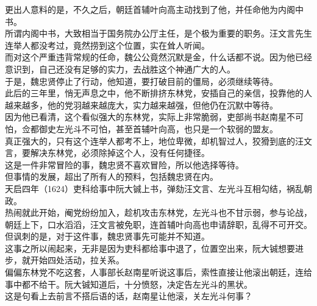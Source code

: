 \begin{multicols}{\theparacolNo}
更出人意料的是，不久之后，朝廷首辅叶向高主动找到了他，并任命他为内阁中书。\\

所谓内阁中书，大致相当于国务院办公厅主任，是个极为重要的职务。汪文言先生连举人都没考过，竟然捞到这个位置，实在耸人听闻。\\

而对这个严重违背常规的任命，魏公公竟然沉默是金，什么话都不说。因为他已经意识到，自己还没有足够的实力，去战胜这个神通广大的人。\\

于是，魏忠贤停止了行动，他知道，要打破目前的僵局，必须继续等待。\\

此后的三年里，悄无声息之中，他不断排挤东林党，安插自己的亲信，投靠他的人越来越多，他的党羽越来越庞大，实力越来越强，但他仍在沉默中等待。\\

因为他已看清，这个看似强大的东林党，实际上非常脆弱，吏部尚书赵南星不可怕，佥都御史左光斗不可怕，甚至首辅叶向高，也只是一个软弱的盟友。\\

真正强大的，只有这个连举人都考不上，地位卑微，却机智过人，狡猾到底的汪文言，要解决东林党，必须除掉这个人，没有任何捷径。\\

这是一件非常冒险的事，魏忠贤不喜欢冒险，所以他选择等待。\\

但事情的发展，超出了所有人的预料，包括魏忠贤在内。\\

天启四年（1624）吏科给事中阮大铖上书，弹劾汪文言、左光斗互相勾结，祸乱朝政。\\

热闹就此开始，阉党纷纷加入，趁机攻击东林党，左光斗也不甘示弱，参与论战，朝廷上下，口水滔滔，汪文言被免职，连首辅叶向高也申请辞职，乱得不可开交。\\

但讽刺的是，对于这件事，魏忠贤事先可能并不知道。\\

这事之所以闹起来，无非是因为吏科都给事中退了，位置空出来，阮大铖想要进步，就开始四处活动，拉关系。\\

偏偏东林党不吃这套，人事部长赵南星听说这事后，索性直接让他滚出朝廷，连给事中都不给干。阮大铖知道后，十分愤怒，决定告左光斗的黑状。\\

这是句看上去前言不搭后语的话，赵南星让他滚，关左光斗何事？\\


\end{multicols}
